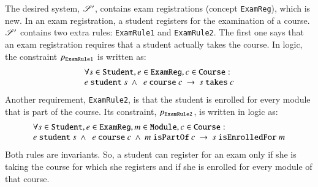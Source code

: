 \documentclass{elsarticle}
\begin{document}
   The desired system, $\mathscr{S}'$, contains exam registrations (concept \verb-ExamReg-), which is new.
   In an exam registration, a student registers for the examination of a course.
   $\mathscr{S}'$ contains two extra rules: \verb-ExamRule1- and \verb-ExamRule2-.
   The first one says that an exam registration requires that a student actually takes the course.
   In logic, the constraint $p_{\tt ExamRule1}$ is written as:
\[\begin{array}{l}\forall s\in\text{\tt Student}, e\in\text{\tt ExamReg}, c\in\text{\tt Course}:\\
   e\ \text{\tt student}\ s\ \wedge\ \ e\ \text{\tt course}\ c\ \rightarrow\ s\ \text{\tt takes}\ c\\
\end{array}\]
   Another requirement, \verb-ExamRule2-, is that the student is enrolled for every module that is part of the course.
   Its constraint, $p_{\tt ExamRule2}$, is written in logic as:
\[\begin{array}{l}\forall s\in\text{\tt Student}, e\in\text{\tt ExamReg}, m\in\text{\tt Module}, c\in\text{\tt Course}:\\
   e\ \text{\tt student}\ s\ \wedge\ \ e\ \text{\tt course}\ c\ \wedge\ m\ \text{\tt isPartOf}\ c\ \rightarrow\ s\ \text{\tt isEnrolledFor}\ m
\end{array}\]
   Both rules are invariants.
   So, a student can register for an exam only if she is taking the course for which she registers and if she is enrolled for every module of that course.
\end{document}
